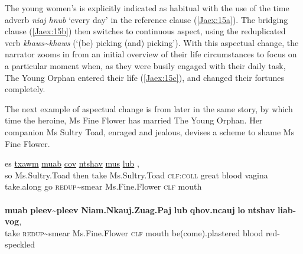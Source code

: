 \documentclass[output=paper]{LSP/langsci}
\begin{document}
\noindent
The young women’s  is explicitly indicated as habitual with the use of the time adverb \textit{niaj hnub} `every day' in the reference clause (\ref{Jaex:15a}). The bridging clause (\ref{Jaex:15b}) then switches to continuous aspect, using the reduplicated verb \textit{khaws\~{}khaws} (`(be) picking (and) picking'). With this aspectual change, the narrator zooms in from an initial overview of their life circumstances to focus on a particular moment when, as they were busily engaged with their daily task, The Young Orphan entered their life (\ref{Jaex:15c}), and changed their fortunes completely.
 
The next example of aspectual change is from later in the same story, by which time the heroine, Ms Fine Flower has married The Young Orphan. Her companion Ms Sultry Toad, enraged and jealous, devises a scheme to shame Ms Fine Flower.
 
\begin{exe}
\ex \label{Jaex:16ab}
\begin{xlist}
\ex \label{Jaex:16a}
\gll es \underline{} \underline{txawm} \underline{muab} \underline{} \underline{cov} \underline{}     \underline{ntshav} \underline{} \underline{} \underline{mus}     \underline{} \underline{} \underline{lub} \underline{},\\
 so Ms.Sultry.Toad    then  take  Ms.Sultry.Toad \textsc{clf:coll} great blood vagina take.along go  \textsc{redup}{\textasciitilde}smear Ms.Fine.Flower \textsc{clf} mouth\\
\glt {}\\
\ex \label{Jaex:16b}
\gll \textbf{muab} \textbf{pleev{\textasciitilde}pleev}  \textbf{Niam.Nkauj.Zuag.Paj} \textbf{lub} \textbf{qhov.ncauj} \textbf{lo} \textbf{ntshav} \textbf{liab-vog}, \\     	      
     take \textsc{redup}{\textasciitilde}smear Ms.Fine.Flower \textsc{clf} mouth be(come).plastered blood  red-speckled\\
\glt {}\citep[][162]{johnson92}
\end{xlist}
\end{exe}
\end{document}
